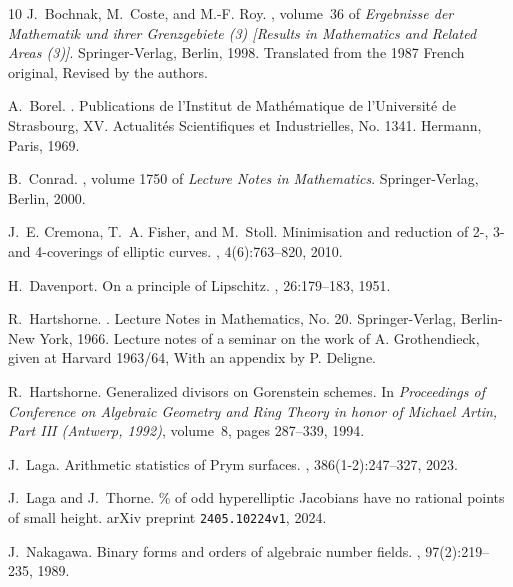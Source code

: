 \begin{thebibliography}{10}
J.~Bochnak, M.~Coste, and M.-F. Roy.
, volume~36 of {\em Ergebnisse der
  Mathematik und ihrer Grenzgebiete (3) [Results in Mathematics and Related
  Areas (3)]}.
\newblock Springer-Verlag, Berlin, 1998.
\newblock Translated from the 1987 French original, Revised by the authors.

A.~Borel.
.
\newblock Publications de l'Institut de Math\'{e}matique de l'Universit\'{e} de
  Strasbourg, XV. Actualit\'{e}s Scientifiques et Industrielles, No. 1341.
  Hermann, Paris, 1969.

B.~Conrad.
, volume 1750 of {\em
  Lecture Notes in Mathematics}.
\newblock Springer-Verlag, Berlin, 2000.

J.~E. Cremona, T.~A. Fisher, and M.~Stoll.
\newblock Minimisation and reduction of 2-, 3- and 4-coverings of elliptic
  curves.
, 4(6):763--820, 2010.

H.~Davenport.
\newblock On a principle of {L}ipschitz.
, 26:179--183, 1951.

R.~Hartshorne.
.
\newblock Lecture Notes in Mathematics, No. 20. Springer-Verlag, Berlin-New
  York, 1966.
\newblock Lecture notes of a seminar on the work of A. Grothendieck, given at
  Harvard 1963/64, With an appendix by P. Deligne.

R.~Hartshorne.
\newblock Generalized divisors on {G}orenstein schemes.
\newblock In {\em Proceedings of {C}onference on {A}lgebraic {G}eometry and
  {R}ing {T}heory in honor of {M}ichael {A}rtin, {P}art {III} ({A}ntwerp,
  1992)}, volume~8, pages 287--339, 1994.

J.~Laga.
\newblock Arithmetic statistics of {P}rym surfaces.
, 386(1-2):247--327, 2023.

J.~Laga and J.~Thorne.
\% of odd hyperelliptic {J}acobians have no rational points of
  small height.
\newblock arXiv preprint \texttt{2405.10224v1}, 2024.

J.~Nakagawa.
\newblock Binary forms and orders of algebraic number fields.
, 97(2):219--235, 1989.


\end{thebibliography}
